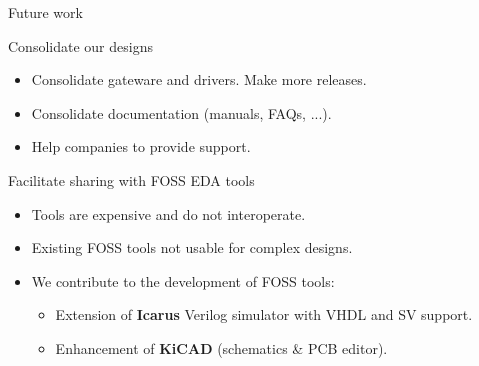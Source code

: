 \documentclass[compress,red]{beamer}
\begin{document}
\begin{frame}{Future work}

  \begin{block}{Consolidate our designs}
    \begin{itemize}
    \item Consolidate gateware and drivers. Make more releases.
    \item Consolidate documentation (manuals, FAQs, ...).
    \item Help companies to provide support.
    \end{itemize}
  \end{block}

  \begin{block}{Facilitate sharing with FOSS EDA tools}
    \begin{itemize}
    \item Tools are expensive and do not interoperate.
    \item Existing FOSS tools not usable for complex designs.
    \item We contribute to the development of FOSS tools:
      \begin{itemize}
      \item Extension of \textbf{Icarus} Verilog simulator with VHDL and SV support. %
      \item Enhancement of \textbf{KiCAD} (schematics \& PCB editor).
      \end{itemize}
    \end{itemize}
  \end{block}


\end{frame}
\end{document}

